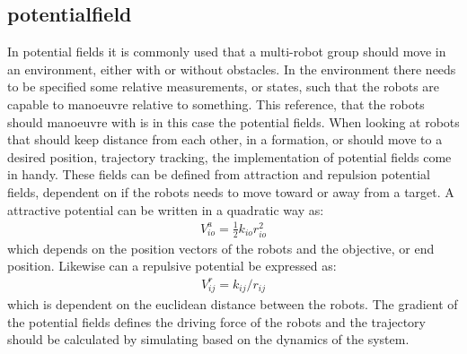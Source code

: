 \subsection{potentialfield}
In potential fields it is commonly used that a multi-robot group should move in an environment, either with or without obstacles. In the environment there needs to be specified some relative measurements, or states, such that the robots are capable to manoeuvre relative to something. This reference, that the robots should manoeuvre with is in this case the potential fields. When looking at robots that should keep distance from each other, in a formation, or should move to a desired position, trajectory tracking, the implementation of potential fields come in handy. These fields can be defined from attraction and repulsion potential fields, dependent on if the robots needs to move toward or away from a target. A attractive potential can be written in a quadratic way as:
\begin{align}
V_{io}^a = \frac{1}{2}k_{io}r_{io}^2
\end{align}
which depends on the position vectors of the robots and the objective, or end position. Likewise can a repulsive potential be expressed as:
\begin{align}
V_{ij}^r = k_{ij}/r_{ij}
\end{align}
which is dependent on the euclidean distance between the robots.
The gradient of the potential fields defines the driving force of the robots and the trajectory should be calculated by simulating based on the dynamics of the system.

